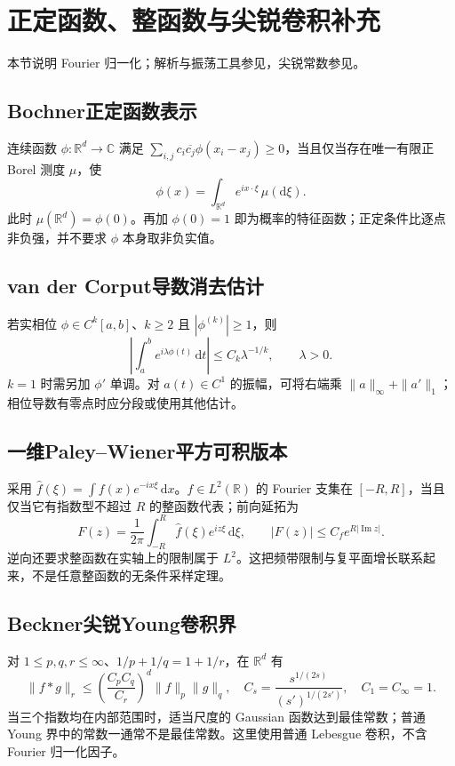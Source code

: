 \documentclass[../main.tex]{subfiles}
\begin{document}
\section{正定函数、整函数与尖锐卷积补充}
本节说明 Fourier 归一化；解析与振荡工具参见\cite{complex,williams}，尖锐常数参见\cite{beckner}。
\subsection{Bochner正定函数表示}
连续函数 $\phi:\mathbb R^d\to\mathbb C$ 满足 $\sum_{i,j}c_i\overline{c_j}\phi(x_i-x_j)\ge0$，当且仅当存在唯一有限正 Borel 测度 $\mu$，使
\[
\phi(x)=\int_{\mathbb R^d}e^{ix\cdot\xi}\,\mu(\mathrm d\xi).
\]
此时 $\mu(\mathbb R^d)=\phi(0)$。再加 $\phi(0)=1$ 即为概率的特征函数；正定条件比逐点非负强，并不要求 $\phi$ 本身取非负实值。
\subsection{van der Corput导数消去估计}
若实相位 $\phi\in C^k[a,b]$、$k\ge2$ 且 $|\phi^{(k)}|\ge1$，则
\[
\left|\int_a^b e^{i\lambda\phi(t)}\,\mathrm dt\right|
\le C_k\lambda^{-1/k},\qquad\lambda>0.
\]
$k=1$ 时需另加 $\phi'$ 单调。对 $a(t)\in C^1$ 的振幅，可将右端乘 $\|a\|_\infty+\|a'\|_1$；相位导数有零点时应分段或使用其他估计。
\subsection{一维Paley--Wiener平方可积版本}
采用 $\widehat f(\xi)=\int f(x)e^{-ix\xi}\,\mathrm dx$。$f\in L^2(\mathbb R)$ 的 Fourier 支集在 $[-R,R]$，当且仅当它有指数型不超过 $R$ 的整函数代表；前向延拓为
\[
F(z)=\frac1{2\pi}\int_{-R}^R\widehat f(\xi)e^{iz\xi}\,\mathrm d\xi,
\qquad |F(z)|\le C_f e^{R|\operatorname{Im}z|}.
\]
逆向还要求整函数在实轴上的限制属于 $L^2$。这把频带限制与复平面增长联系起来，不是任意整函数的无条件采样定理。
\subsection{Beckner尖锐Young卷积界}
对 $1\le p,q,r\le\infty$、$1/p+1/q=1+1/r$，在 $\mathbb R^d$ 有
\[
\|f*g\|_r\le\left(\frac{C_pC_q}{C_r}\right)^d\|f\|_p\|g\|_q,
\quad C_s=\frac{s^{1/(2s)}}{(s')^{1/(2s')}},\quad C_1=C_\infty=1.
\]
当三个指数均在内部范围时，适当尺度的 Gaussian 函数达到最佳常数；普通 Young 界中的常数一通常不是最佳常数。这里使用普通 Lebesgue 卷积，不含 Fourier 归一化因子。
\clearpage
\end{document}
